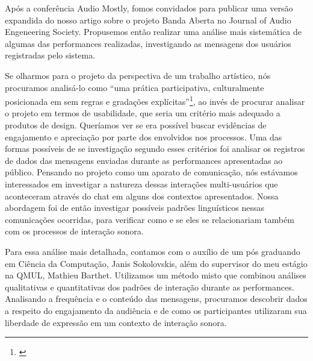 Após a conferência Audio Mostly, fomos convidados para publicar uma versão expandida do nosso artigo sobre o projeto Banda Aberta no Journal of Audio Engeneering Society. Propusemos então realizar uma análise mais sistemática de algumas das performances realizadas, investigando as mensagens dos usuários registradas pelo sistema. 

 Se olharmos para o projeto da perspectiva de um trabalho artístico, nós procuramos analisá-lo como ``uma prática participativa, culturalmente posicionada em sem regras e gradações explícitas''\footnote{\cite{McCullough1998}}, ao invés de procurar analisar o projeto em termos de usabilidade, que seria um critério mais adequado a produtos de design. Queríamos ver se era possível buscar evidências de engajamento e apreciação por parte dos envolvidos nos processos. Uma das formas possíveis de se investigação segundo esses critérios foi analisar os registros de dados das mensagens enviadas durante as performances apresentadas ao público. Pensando no projeto como um aparato de comunicação, nós estávamos interessados em investigar a natureza dessas interações multi-usuários que aconteceram através do chat em alguns dos contextos apresentados. Nossa abordagem foi de então investigar possíveis padrões linguísticos nessas comunicações ocorridas, para verificar como e se eles se relacionariam também com os processos de interação sonora.



Para essa análise mais detalhada, contamos com o auxílio de um pós graduando em Ciência da Computação, Janis Sokolovskis, além do supervisor do meu estágio na QMUL, Mathieu Barthet. Utilizamos um método misto que combinou análises qualitativas e quantitativas dos padrões de interação durante as performances. Analisando a frequência e o conteúdo das mensagens, procuramos descobrir dados a respeito do engajamento da audiência e de como os participantes utilizaram sua liberdade de expressão em um contexto de interação sonora. 


